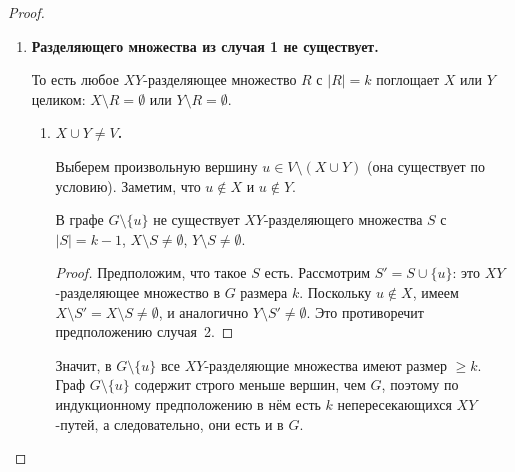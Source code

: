 \begin{proof}
\begin{enumerate}
\begin{proof}
			Поскольку $R$ разделяет $X$ и $Y$ в $G$, путь $p$
			проходит через хотя бы одну вершину из $R$.
			Рассмотрим \emph{первую} такую вершину $r \in R$.
			Начальный отрезок пути $p$ от $X$ до $r$ не содержит
			вершин из $R \setminus \{r\}$, поэтому он целиком
			проходит в $G_X$ (по определению $V_X$).
			Этот отрезок соединяет $X$ с $r \in R$, не пересекая $S$
			--- противоречие с тем, что $S$ разделяет $X$ и $R$ в $G_X$.
		\end{proof}
		
		Отсюда: любое $XR$-разделяющее множество в $G_X$ имеет
		размер $\geq k$. По индукционному предположению в $G_X$
		найдётся $k$ непересекающихся $XR$-путей; аналогично в
		$G_Y$ --- $k$ непересекающихся $YR$-путей.
		Склеивая каждый $XR$-путь с соответствующим $YR$-путём
		через вершину $R$ и пользуясь тем, что $V_X \cap V_Y = \emptyset$,
		получаем $k$ попарно непересекающихся $XY$-путей.
		
		\item \textbf{Разделяющего множества из случая 1 не существует.}
		
		То есть любое $XY$-разделяющее множество $R$ с $|R| = k$
		поглощает $X$ или $Y$ целиком: $X \setminus R = \emptyset$
		или $Y \setminus R = \emptyset$.
		
		\begin{enumerate}
			\item \textbf{$X \cup Y \neq V$.}
			
			Выберем произвольную вершину $u \in V \setminus (X \cup Y)$
			(она существует по условию). Заметим, что $u \notin X$
			и $u \notin Y$.
			
			\begin{Statement}{}{}
				В графе $G \setminus \{u\}$ не существует
				$XY$-разделяющего множества $S$ с $|S| = k - 1$,
				$X \setminus S \neq \emptyset$,
				$Y \setminus S \neq \emptyset$.
			\end{Statement}
			\begin{proof}
				Предположим, что такое $S$ есть.
				Рассмотрим $S' = S \cup \{u\}$: это $XY$-разделяющее
				множество в $G$ размера $k$. Поскольку $u \notin X$,
				имеем $X \setminus S' = X \setminus S \neq \emptyset$,
				и аналогично $Y \setminus S' \neq \emptyset$.
				Это противоречит предположению случая~2.
			\end{proof}
			
			Значит, в $G \setminus \{u\}$ все $XY$-разделяющие
			множества имеют размер $\geq k$. Граф $G \setminus \{u\}$
			содержит строго меньше вершин, чем $G$, поэтому по
			индукционному предположению в нём есть $k$ непересекающихся
			$XY$-путей, а следовательно, они есть и в $G$.
			

\end{enumerate}
\end{enumerate}
\end{proof}

